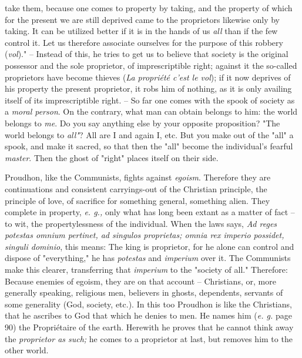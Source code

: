 \documentclass[a4paper]{book}
\begin{document}
take them, because one comes to property by taking, and the property of which 
for the present we are still deprived came to the proprietors likewise only by 
taking. It can be utilized better if it is in the hands of us \textit{all} 
than if the few control it. Let us therefore associate ourselves for the 
purpose of this robbery (\textit{vol})."{} -- Instead of this, he tries to get 
us to believe that society is the original possessor and the sole proprietor, 
of imprescriptible right; against it the so-called proprietors have become 
thieves (\textit{La propri\'et\'e c'est le vol}); if it now deprives of his 
property the present proprietor, it robs him of nothing, as it is only 
availing itself of its imprescriptible right. -- So far one comes with the 
spook of society as a \textit{moral person}. On the contrary, what man can 
obtain belongs to him: the world belongs to \textit{me}. Do you say anything 
else by your opposite proposition? "{}The world belongs to \textit{all"{}}? 
All are I and again I, etc. But you make out of the "{}all"{} a spook, and 
make it sacred, so that then the "{}all"{} become the individual's fearful 
\textit{master}. Then the ghost of "{}right"{} places itself on their side.

Proudhon, like the Communists, fights against \textit{egoism}. Therefore they 
are continuations and consistent carryings-out of the Christian principle, the 
principle of love, of sacrifice for something general, something alien. They 
complete in property, \textit{e. g.,} only what has long been extant as a 
matter of fact -- to wit, the propertylessness of the individual. When the 
laws says, \textit{Ad reges potestas omnium pertinet, ad singulos proprietas; 
omnia rex imperio possidet, singuli dominio}, this means: The king is 
proprietor, for he alone can control and dispose of "{}everything,"{} he has 
\textit{potestas} and \textit{imperium} over it. The Communists make this 
clearer, transferring that \textit{imperium} to the "{}society of all."{} 
Therefore: Because enemies of egoism, they are on that account -- Christians, 
or, more generally speaking, religious men, believers in ghosts, dependents, 
servants of some generality (God, society, etc.). In this too Proudhon is like 
the Christians, that he ascribes to God that which he denies to men. He names 
him (\textit{e. g.} page 90) the Propri\'etaire of the earth. Herewith he 
proves that he cannot think away the \textit{proprietor as such;} he comes to 
a proprietor at last, but removes him to the other world.
\end{document}

